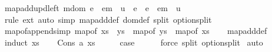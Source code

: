 \begin{isabellebody}
\isanewline
{}\isamarkupfalse%
\ map{\isacharunderscore}{\kern0pt}add{\isacharunderscore}{\kern0pt}upd{\isacharunderscore}{\kern0pt}left{\isacharcolon}{\kern0pt}\ {\isachardoublequoteopen}m{\isasymnotin}dom\ e{}\ {\isasymLongrightarrow}\ e{}{\isacharparenleft}{\kern0pt}m\ {\isasymmapsto}\ u{}{\isacharparenright}{\kern0pt}\ {\isacharplus}{\kern0pt}{\isacharplus}{\kern0pt}\ e{}\ {\isacharequal}{\kern0pt}\ {\isacharparenleft}{\kern0pt}e{}\ {\isacharplus}{\kern0pt}{\isacharplus}{\kern0pt}\ e{}{\isacharparenright}{\kern0pt}{\isacharparenleft}{\kern0pt}m\ {\isasymmapsto}\ u{}{\isacharparenright}{\kern0pt}{\isachardoublequoteclose}\isanewline
%
\isadelimproof
%
\endisadelimproof
%
\isatagproof
{}\isamarkupfalse%
\ {\isacharparenleft}{\kern0pt}rule\ ext{\isacharparenright}{\kern0pt}\ {\isacharparenleft}{\kern0pt}auto\ simp{\isacharcolon}{\kern0pt}\ map{\isacharunderscore}{\kern0pt}add{\isacharunderscore}{\kern0pt}def\ dom{\isacharunderscore}{\kern0pt}def\ split{\isacharcolon}{\kern0pt}\ option{\isachardot}{\kern0pt}split{\isacharparenright}{\kern0pt}%
\endisatagproof
{\isafoldproof}%
%
\isadelimproof
\isanewline
%
\endisadelimproof
\isanewline
{}\isamarkupfalse%
\ map{\isacharunderscore}{\kern0pt}of{\isacharunderscore}{\kern0pt}append{\isacharbrackleft}{\kern0pt}simp{\isacharbrackright}{\kern0pt}{\isacharcolon}{\kern0pt}\ {\isachardoublequoteopen}map{\isacharunderscore}{\kern0pt}of\ {\isacharparenleft}{\kern0pt}xs\ {\isacharat}{\kern0pt}\ ys{\isacharparenright}{\kern0pt}\ {\isacharequal}{\kern0pt}\ map{\isacharunderscore}{\kern0pt}of\ ys\ {\isacharplus}{\kern0pt}{\isacharplus}{\kern0pt}\ map{\isacharunderscore}{\kern0pt}of\ xs{\isachardoublequoteclose}\isanewline
%
\isadelimproof
\ \ %
\endisadelimproof
%
\isatagproof
{}\isamarkupfalse%
\ map{\isacharunderscore}{\kern0pt}add{\isacharunderscore}{\kern0pt}def\isanewline
{}\isamarkupfalse%
\ {\isacharparenleft}{\kern0pt}induct\ xs{\isacharparenright}{\kern0pt}\isanewline
\ \ \isamarkupfalse%
\ {\isacharparenleft}{\kern0pt}Cons\ a\ xs{\isacharparenright}{\kern0pt}\isanewline
\ \ \isamarkupfalse%
\ \isamarkupfalse%
\ {\isacharquery}{\kern0pt}case\isanewline
\ \ \ \ \isamarkupfalse%
\ {\isacharparenleft}{\kern0pt}force\ split{\isacharcolon}{\kern0pt}\ option{\isachardot}{\kern0pt}split{\isacharparenright}{\kern0pt}\isanewline
{}\isamarkupfalse%
\ auto%
\endisatagproof
{\isafoldproof}%

\end{isabellebody}
